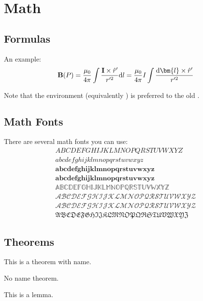 \documentclass[showbib, lang=en]{DeanReport}
\begin{document}
\section{Math}
\label{sec:math}

\subsection{Formulas}
An example:
\begin{displaymath}
    \mathbf{B}(P) = \frac{\mu_0}{4\pi}\int\frac{\mathbf{I}\times\hat{r}'}{r'^2}{\rm d}l = \frac{\mu_0}{4\pi} I \int \frac{{\rm d}\bm{l}\times \hat{r}'}{r'^2}
\end{displaymath}

Note that the  environment (equivalently \code{\textbackslash[...\textbackslash]}) is preferred to the old \code{\$\$}.

\subsection{Math Fonts}
There are several math fonts you can use:
\allowdisplaybreaks
\begin{align}
    ABCDEFGHIJKLMNOPQRSTUVWXYZ\\
    abcdefghijklmnopqrstuvwxyz\\
    \mathbf{abcdefghijklmnopqrstuvwxyz}\\
    \bm{abcdefghijklmnopqrstuvwxyz}\\
    \mathbb{ABCDEFGHIJKLMNOPQRSTUVWXYZ}\\
    \mathcal{ABCDEFGHIJKLMNOPQRSTUVWXYZ}\\
    \mathscr{ABCDEFGHIJKLMNOPQRSTUVWXYZ}\\
    \mathfrak{ABCDEFGHIJKLMNOPQRSTUVWXYZ}
\end{align}

\subsection{Theorems}

\begin{theorem}
    This is a theorem with name.
\end{theorem}

\begin{theorem}
    No name theorem.
\end{theorem}

\begin{lemma}
    This is a lemma.
\end{lemma}
\end{document}
